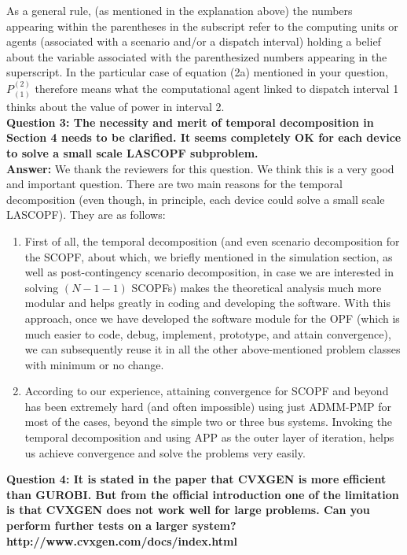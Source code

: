 \documentclass[8pt]{article}
\begin{document}
As a general rule, (as mentioned in the explanation above) the numbers appearing within the parentheses in the subscript refer to the computing units or agents (associated with a scenario and/or a dispatch interval) holding a belief about the variable associated with the parenthesized numbers appearing in the superscript. In the particular case of equation (2a) mentioned in your question, $P_{(1)}^{(2)}$ therefore means what the computational agent linked to dispatch interval 1 thinks about the value of power in interval 2. \\

\textbf{Question 3: The necessity and merit of temporal decomposition in Section 4 needs to be clarified. It seems completely OK for each device to solve a small scale LASCOPF subproblem.}\\

\textbf{Answer: }We thank the reviewers for this question. We think this is a very good and important question. There are two main reasons for the temporal decomposition (even though, in principle, each device could solve a small scale LASCOPF). They are as follows:\\
\begin{enumerate}
    \item First of all, the temporal decomposition (and even scenario decomposition for the SCOPF, about which, we briefly mentioned in the simulation section, as well as post-contingency scenario decomposition, in case we are interested in solving $(N-1-1)$ SCOPFs) makes the theoretical analysis much more modular and helps greatly in coding and developing the software. With this approach, once we have developed the software module for the OPF (which is much easier to code, debug, implement, prototype, and attain convergence), we can subsequently reuse it in all the other above-mentioned problem classes with minimum or no change. 
    \item According to our experience, attaining convergence for SCOPF and beyond has been extremely hard (and often impossible) using just ADMM-PMP for most of the cases, beyond the simple two or three bus systems. Invoking the temporal decomposition and using APP as the outer layer of iteration, helps us achieve convergence and solve the problems very easily.
\end{enumerate}

\textbf{Question 4: It is stated in the paper that CVXGEN is more efficient than GUROBI. But from the official introduction one of the limitation is that CVXGEN does not work well for large problems. Can you perform further tests on a larger system?\\http://www.cvxgen.com/docs/index.html}\\
\end{document}
